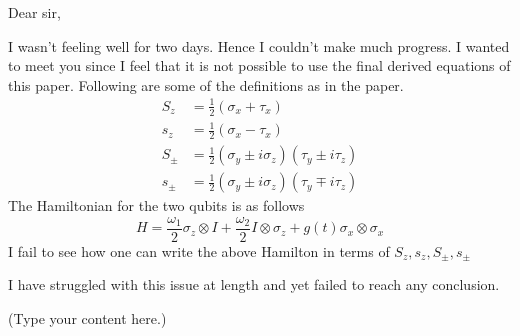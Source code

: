 \documentclass{article}
\begin{document}
\begin{flushleft}
Dear sir,
\end{flushleft} %
I wasn't feeling well for two days. Hence I couldn't make much progress.
I wanted to meet you since I feel that it is not possible to use the final derived equations of this paper.  Following are some of the definitions as in the paper.
\begin{align}
S_{z} &=  \frac{1}{2} \left(\sigma_{x} + \tau_{x} \right)\\
s_{z} &=  \frac{1}{2} \left(\sigma_{x} - \tau_{x} \right) \\
S_{\pm}&= \frac{1}{2} \left( \sigma_{y} \pm i\sigma_{z}  \right) \left( \tau_{y} \pm i\tau_{z} \right)\\
s_{\pm}&= \frac{1}{2} \left( \sigma_{y} \pm i\sigma_{z}  \right) \left( \tau_{y} \mp i\tau_{z} \right)
\end{align}
The Hamiltonian for the two qubits is as follows 
 \[ H  = \frac{\omega_{1}}{2} \sigma_{z} \otimes I +\frac{\omega_{2}}{2}I \otimes \sigma_{z} + g(t)\sigma_{x} \otimes \sigma_{x}
 \]
 I fail to see how one can write the above Hamilton in terms of $S_{z}, s_{z}, S_{\pm}, s_{\pm}$
 
I have struggled with this issue at length and yet failed to reach any conclusion.  

(Type your content here.)
\end{document}
